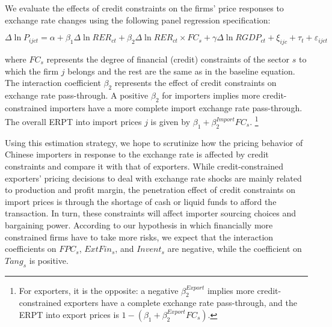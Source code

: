 We evaluate the effects of credit constraints on the firms' price responses to exchange rate changes using the following panel regression specification:

\begin{equation}
	\Delta \ln P_{ijct}=\alpha+\beta_{1} \Delta \ln RER_{ct}+\beta_{2} \Delta \ln RER_{ct} \times FC_{s}+\gamma \Delta \ln RGDP_{ct}+\xi_{ijc}+\tau_{t} +\varepsilon_{ijct}
	\label{eq.credit}
\end{equation}

\noindent where $FC_{s}$ represents the degree of financial (credit) constraints of the sector $s$ to which the firm $j$ belongs and the rest are the same as in the baseline equation. The interaction coefficient $\beta_2$ represents the effect of credit constraints on exchange rate pass-through. A positive $\beta_2$ for importers implies more credit-constrained importers have a more complete import exchange rate pass-through. The overall ERPT into import prices $j$ is given by $\beta_{1} +\beta^{Import}_{2} FC_{s}$. \footnote{For exporters, it is the opposite: a negative $\beta^{Export}_2$ implies more credit-constrained exporters have a complete exchange rate pass-through, and the ERPT into export prices is $1-(\beta_{1} +\beta^{Export}_{2} FC_{s})$.}

Using this estimation strategy, we hope to scrutinize how the pricing behavior of Chinese importers in response to the exchange rate is affected by credit constraints and compare it with that of exporters. While credit-constrained exporters’ pricing decisions to deal with exchange rate shocks are mainly related to production and profit margin, the penetration effect of credit constraints on import prices is through the shortage of cash or liquid funds to afford the transaction. In turn, these constraints will affect importer sourcing choices and bargaining power. According to our hypothesis in which financially more constrained firms have to take more risks, we expect that the interaction coefficients on $FPC_{s}$, $ExtFin_{s}$, and $Invent_{s}$ are negative, while the coefficient on $Tang_{s}$ is positive.

